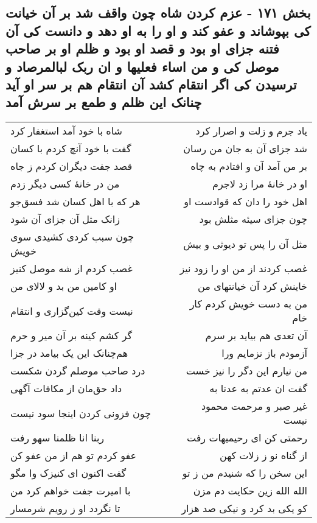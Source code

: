 \begin{center}
\section*{بخش ۱۷۱ - عزم کردن شاه چون واقف شد بر آن خیانت کی بپوشاند و عفو کند و او را به او دهد و دانست کی آن فتنه جزای او بود و قصد او بود و ظلم او بر صاحب موصل کی و من اساء فعلیها و ان ربک لبالمرصاد و ترسیدن کی اگر انتقام کشد آن انتقام هم بر سر او آید چنانک این ظلم و طمع بر سرش آمد}
\label{sec:sh171}
\begin{longtable}{l p{0.5cm} r}
شاه با خود آمد استغفار کرد
&&
یاد جرم و زلت و اصرار کرد
\\
گفت با خود آنچ کردم با کسان
&&
شد جزای آن به جان من رسان
\\
قصد جفت دیگران کردم ز جاه
&&
بر من آمد آن و افتادم به چاه
\\
من در خانهٔ کسی دیگر زدم
&&
او در خانهٔ مرا زد لاجرم
\\
هر که با اهل کسان شد فسق‌جو
&&
اهل خود را دان که قوادست او
\\
زانک مثل آن جزای آن شود
&&
چون جزای سیئه مثلش بود
\\
چون سبب کردی کشیدی سوی خویش
&&
مثل آن را پس تو دیوثی و بیش
\\
غصب کردم از شه موصل کنیز
&&
غصب کردند از من او را زود نیز
\\
او کامین من بد و لالای من
&&
خاینش کرد آن خیانتهای من
\\
نیست وقت کین‌گزاری و انتقام
&&
من به دست خویش کردم کار خام
\\
گر کشم کینه بر آن میر و حرم
&&
آن تعدی هم بیاید بر سرم
\\
هم‌چنانک این یک بیامد در جزا
&&
آزمودم باز نزمایم ورا
\\
درد صاحب موصلم گردن شکست
&&
من نیارم این دگر را نیز خست
\\
داد حق‌مان از مکافات آگهی
&&
گفت ان عدتم به عدنا به
\\
چون فزونی کردن اینجا سود نیست
&&
غیر صبر و مرحمت محمود نیست
\\
ربنا انا ظلمنا سهو رفت
&&
رحمتی کن ای رحیمیهات رفت
\\
عفو کردم تو هم از من عفو کن
&&
از گناه نو ز زلات کهن
\\
گفت اکنون ای کنیزک وا مگو
&&
این سخن را که شنیدم من ز تو
\\
با امیرت جفت خواهم کرد من
&&
الله الله زین حکایت دم مزن
\\
تا نگردد او ز رویم شرمسار
&&
کو یکی بد کرد و نیکی صد هزار
\\

\end{longtable}
\end{center}
